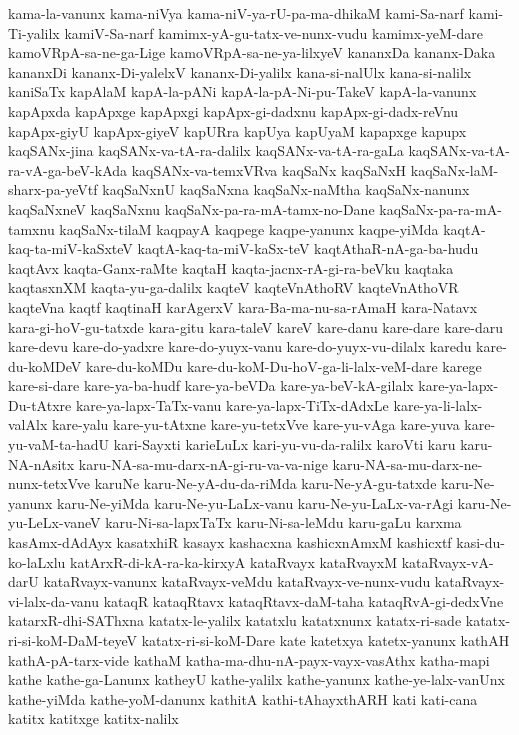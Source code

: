 {kama-la-vanunx
kama-niVya
kama-niV-ya-rU-pa-ma-dhikaM
kami-Sa-narf
kami-Ti-yalilx
kamiV-Sa-narf
kamimx-yA-gu-tatx-ve-nunx-vudu
kamimx-yeM-dare
kamoVRpA-sa-ne-ga-Lige
kamoVRpA-sa-ne-ya-lilxyeV
kananxDa
kananx-Daka
kananxDi
kananx-Di-yalelxV
kananx-Di-yalilx
kana-si-nalUlx
kana-si-nalilx
kaniSaTx
kapAlaM
kapA-la-pANi
kapA-la-pA-Ni-pu-TakeV
kapA-la-vanunx
kapApxda
kapApxge
kapApxgi
kapApx-gi-dadxnu
kapApx-gi-dadx-reVnu
kapApx-giyU
kapApx-giyeV
kapURra
kapUya
kapUyaM
kapapxge
kapupx
kaqSANx-jina
kaqSANx-va-tA-ra-dalilx
kaqSANx-va-tA-ra-gaLa
kaqSANx-va-tA-ra-vA-ga-beV-kAda
kaqSANx-va-temxVRva
kaqSaNx
kaqSaNxH
kaqSaNx-laM-sharx-pa-yeVtf
kaqSaNxnU
kaqSaNxna
kaqSaNx-naMtha
kaqSaNx-nanunx
kaqSaNxneV
kaqSaNxnu
kaqSaNx-pa-ra-mA-tamx-no-Dane
kaqSaNx-pa-ra-mA-tamxnu
kaqSaNx-tilaM
kaqpayA
kaqpege
kaqpe-yanunx
kaqpe-yiMda
kaqtA-kaq-ta-miV-kaSxteV
kaqtA-kaq-ta-miV-kaSx-teV‌
kaqtAthaR-nA-ga-ba-hudu
kaqtAvx
kaqta-Ganx-raMte
kaqtaH
kaqta-jacnx-rA-gi-ra-beVku
kaqtaka
kaqtasxnXM
kaqta-yu-ga-dalilx
kaqteV
kaqteVnAthoRV
kaqteVnAthoVR
kaqteVna
kaqtf
kaqtinaH
karAgerxV
kara-Ba-ma-nu-sa-rAmaH
kara-Natavx
kara-gi-hoV-gu-tatxde
kara-gitu
kara-taleV
kareV
kare-danu
kare-dare
kare-daru
kare-devu
kare-do-yadxre
kare-do-yuyx-vanu
kare-do-yuyx-vu-dilalx
karedu
kare-du-koMDeV
kare-du-koMDu
kare-du-koM-Du-hoV-ga-li-lalx-veM-dare
karege
kare-si-dare
kare-ya-ba-hudf
kare-ya-beVDa
kare-ya-beV-kA-gilalx
kare-ya-lapx-Du-tAtxre
kare-ya-lapx-TaTx-vanu
kare-ya-lapx-TiTx-dAdxLe
kare-ya-li-lalx-valAlx
kare-yalu
kare-yu-tAtxne
kare-yu-tetxVve
kare-yu-vAga
kare-yuva
kare-yu-vaM-ta-hadU
kari-Sayxti
karieLuLx
kari-yu-vu-da-ralilx
karoVti
karu
karu-NA-nAsitx
karu-NA-sa-mu-darx-nA-gi-ru-va-va-nige
karu-NA-sa-mu-darx-ne-nunx-tetxVve
karuNe
karu-Ne-yA-du-da-riMda
karu-Ne-yA-gu-tatxde
karu-Ne-yanunx
karu-Ne-yiMda
karu-Ne-yu-LaLx-vanu
karu-Ne-yu-LaLx-va-rAgi
karu-Ne-yu-LeLx-vaneV
karu-Ni-sa-lapxTaTx
karu-Ni-sa-leMdu
karu-gaLu
karxma
kasAmx-dAdAyx
kasatxhiR
kasayx
kashacxna
kashicxnAmxM
kashicxtf
kasi-du-ko-laLxlu
katArxR-di-kA-ra-ka-kirxyA
kataRvayx
kataRvayxM
kataRvayx-vA-darU
kataRvayx-vanunx
kataRvayx-veMdu
kataRvayx-ve-nunx-vudu
kataRvayx-vi-lalx-da-vanu
kataqR
kataqRtavx
kataqRtavx-daM-taha
kataqRvA-gi-dedxVne
katarxR-dhi-SAThxna
katatx-le-yalilx
katatxlu
katatxnunx
katatx-ri-sade
katatx-ri-si-koM-DaM-teyeV
katatx-ri-si-koM-Dare
kate
katetxya
katetx-yanunx
kathAH
kathA-pA-tarx-vide
kathaM
katha-ma-dhu-nA-payx-vayx-vasAthx
katha-mapi
kathe
kathe-ga-Lanunx
katheyU
kathe-yalilx
kathe-yanunx
kathe-ye-lalx-vanUnx
kathe-yiMda
kathe-yoM-danunx
kathitA
kathi-tAhayxthARH
kati
kati-cana
katitx
katitxge
katitx-nalilx
}
